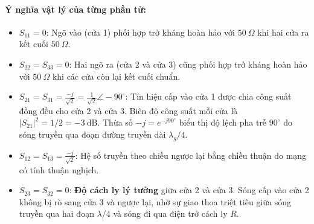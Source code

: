 \documentclass[12pt,a4paper]{article}
\begin{document}
\paragraph{Ý nghĩa vật lý của từng phần tử:}
\begin{itemize}
    \item $S_{11} = 0$: Ngõ vào (cửa 1) phối hợp trở kháng hoàn hảo với $50~\Omega$ khi hai cửa ra kết cuối $50~\Omega$.
    \item $S_{22} = S_{33} = 0$: Hai ngõ ra (cửa 2 và cửa 3) cũng phối hợp trở kháng hoàn hảo với $50~\Omega$ khi các cửa còn lại kết cuối chuẩn.
    \item $S_{21} = S_{31} = \frac{-j}{\sqrt{2}} = \frac{1}{\sqrt{2}} \angle -90^\circ$: Tín hiệu cấp vào cửa 1 được chia công suất đồng đều cho cửa 2 và cửa 3. Biên độ công suất mỗi cửa là $|S_{21}|^2 = 1/2 = -3~\text{dB}$. Thừa số $-j = e^{-j90^\circ}$ biểu thị độ lệch pha trễ $90^\circ$ do sóng truyền qua đoạn đường truyền dài $\lambda_g/4$.
    \item $S_{12} = S_{13} = \frac{-j}{\sqrt{2}}$: Hệ số truyền theo chiều ngược lại bằng chiều thuận do mạng có tính thuận nghịch.
    \item $S_{23} = S_{32} = 0$: \textbf{Độ cách ly lý tưởng} giữa cửa 2 và cửa 3. Sóng cấp vào cửa 2 không bị rò sang cửa 3 và ngược lại, nhờ sự giao thoa triệt tiêu giữa sóng truyền qua hai đoạn $\lambda/4$ và sóng đi qua điện trở cách ly $R$.
\end{itemize}
\end{document}
